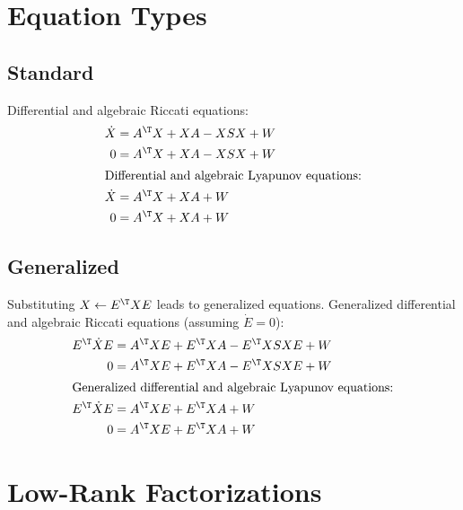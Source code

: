 \section{Equation Types}
\subsection{Standard}

Differential and algebraic Riccati equations:
\begin{align}
  \dot{X} &= A^\T X + XA - XSX + W \\
  0 &= A^\T X + XA - XSX + W \\
\intertext{Differential and algebraic Lyapunov equations:}
  \dot{X} &= A^\T X + XA + W \\
  0 &= A^\T X + XA + W
\end{align}

\subsection{Generalized}

Substituting $X\gets E^\T XE$ leads to generalized equations.
Generalized differential and algebraic Riccati equations (assuming $\dot E = 0$):
\begin{align}
  E^\T \dot{X}E &= A^\T XE + E^\T XA - E^\T XSXE + W \\
  0 &= A^\T XE + E^\T XA - E^\T XSXE + W \\
\intertext{Generalized differential and algebraic Lyapunov equations:}
  E^\T \dot{X}E &= A^\T XE + E^\T XA + W \\
  0 &= A^\T XE + E^\T XA + W \\
\end{align}

\cite{Lang2017}

\section{Low-Rank Factorizations}

